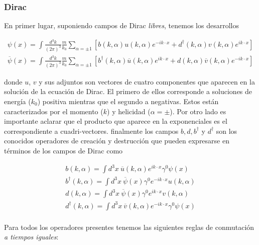 \documentclass{article}
\numberwithin{equation}{section}
\begin{document}
\subsubsection{Dirac}\label{sec_dirac}

En primer lugar, suponiendo campos de Dirac \textit{libres}, tenemos los desarrollos 

\begin{equation}\label{dirac}
\begin{aligned}
\psi(x) = \int \frac{d^3k}{(2\pi)^3}\frac{m}{k_0}\sum_{\alpha=\pm 1 }\left[b(k,\alpha)u(k,\alpha) e^{-i k \cdot x} + d^{\dagger}(k,\alpha)v(k,\alpha)e^{i k \cdot x}\right]\\
\overline{\psi}(x) = \int \frac{d^3k}{(2\pi)^3}\frac{m}{k_0}\sum_{\alpha=\pm 1 }\left[b^{\dagger}(k,\alpha)\overline{u}(k,\alpha) e^{i k \cdot x} + d(k,\alpha)\overline{v}(k,\alpha)e^{-i k \cdot x}\right]
\end{aligned}
\end{equation} 

donde $ u $, $ v $ y sus adjuntos son vectores de cuatro componentes que aparecen en la solución de la ecuación de Dirac. El primero de ellos corresponde a soluciones de energía ($ k_0 $) positiva mientras que el segundo a negativas. Estos están caracterizados por el momento ($ k $) y helicidad ($ \alpha=\pm $). Por otro lado es importante aclarar que el producto que aparece en la exponenciales es el correspondiente a cuadri-vectores. finalmente los campos $ b,d,b^{\dagger} $ y $ d^{\dagger} $ son los conocidos operadores de creación y destrucción que pueden expresarse en términos de los campos de Dirac como

\begin{equation}\label{key}
\begin{aligned}
b(k,\alpha)=\int d^3x \ \overline{u}(k,\alpha)e^{i k \cdot x}\gamma^0\psi (x)\\
b^{\dagger}(k,\alpha)=\int d^3x \ \overline{\psi}(x)\gamma^0 e^{-i k \cdot x}u(k,\alpha)\\
d(k,\alpha)=\int d^3x \ \overline{\psi}(x)\gamma^0 e^{i k \cdot x}v(k,\alpha)\\
d^{\dagger}(k,\alpha)=\int d^3x \ \overline{v}(k,\alpha)e^{-i k \cdot x}\gamma^0\psi (x)\\
\end{aligned}
\end{equation}

Para todos los operadores presentes tenemos las siguientes reglas de conmutación \textit{a tiempos iguales}:
\end{document}
